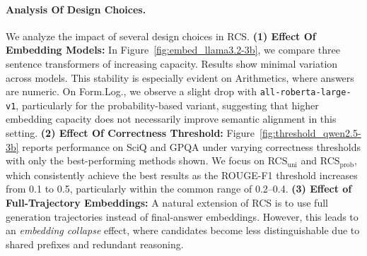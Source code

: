 \paragraph{Analysis Of Design Choices.}
We analyze the impact of several design choices in RCS. 
\textbf{(1) Effect Of Embedding Models:} In Figure~\ref{fig:embed_llama3.2-3b}, we compare three sentence transformers of increasing capacity. 
Results show minimal variation across models. This stability is especially evident on Arithmetics, where answers are numeric. 
On Form.Log., we observe a slight drop with \texttt{all-roberta-large-v1}, particularly for the probability-based variant, suggesting that higher embedding capacity does not necessarily improve semantic alignment in this setting. 
\textbf{(2) Effect Of Correctness Threshold:} Figure~\ref{fig:threshold_qwen2.5-3b} reports performance on SciQ and GPQA under varying correctness thresholds with only the best-performing methods shown. 
We focus on \textsc{RCS}$_{\text{uni}}$ and \textsc{RCS}$_{\text{prob}}$, which consistently achieve the best results as the ROUGE-F1 threshold increases from 0.1 to 0.5, particularly within the common range of 0.2--0.4. 
\textbf{(3) Effect of Full-Trajectory Embeddings:}\label{sec:embedding-collapse} A natural extension of RCS is to use full generation trajectories instead of final-answer embeddings. 
However, this leads to an \textit{embedding collapse} effect, where candidates become less distinguishable due to shared prefixes and redundant reasoning.
